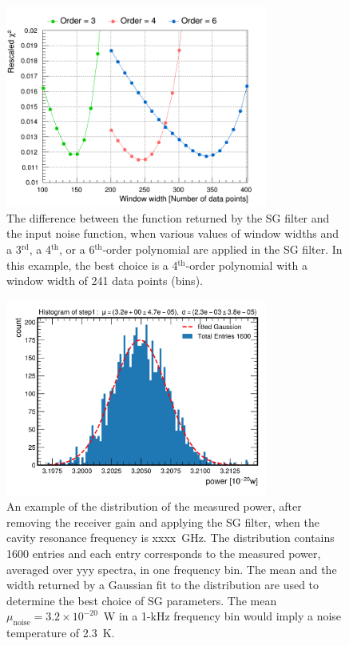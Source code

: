 \begin{figure} [htbp]
  \centering
  \includegraphics[width=8.6cm]{figures/chi2_Different_Order_Window_SGFilter.png}
  \caption{The difference between the function returned by the SG filter 
  and the input noise function, when various values of window widths and 
  a 3$^\text{rd}$, a 4$^\text{th}$, or a 
  6$^\text{th}$-order polynomial are applied in the SG filter. In this 
  example, the best choice is a 4$^\text{th}$-order polynomial with 
  a window width of 241 data points (bins). }
  \label{fig:sgoptimize}
\end{figure}
 


\begin{figure} [htbp]
  \centering
  \includegraphics[width=8.6cm]{figures/sysSG_temphistogram.png}
  \caption{An example of the distribution of the measured power, after 
removing the receiver gain and applying the SG filter, when 
the cavity resonance frequency is xxxx~GHz. The distribution contains 
1600 entries and each entry corresponds to the measured power, averaged
over yyy spectra, in one frequency bin. The mean and the width returned by 
a Gaussian fit to the distribution are used to determine the best choice of 
SG parameters. The mean $\mu_\text{noise}=3.2\times10^{-20}$~W in 
a 1-kHz frequency bin would imply a noise temperature of 2.3~K.}
  \label{fig:noisegauss}
\end{figure}
 


